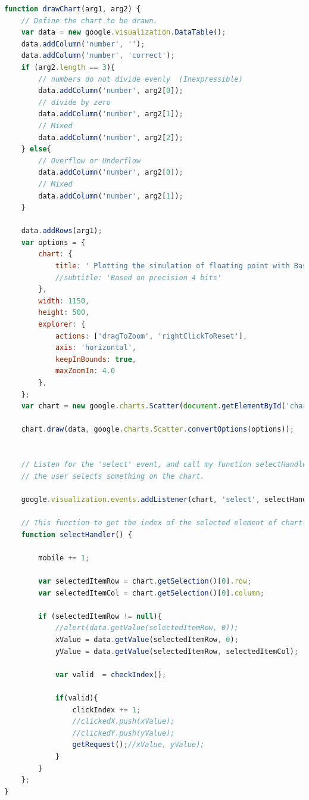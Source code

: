 \documentclass[11pt]{article}
\begin{document}
\begin{lstlisting}[label={lst:drawChart}, language=Javascript, caption={drawChart function will visualize the passed data to user.},]
function drawChart(arg1, arg2) {
	// Define the chart to be drawn. 
	var data = new google.visualization.DataTable();
	data.addColumn('number', '');
	data.addColumn('number', 'correct');
	if (arg2.length == 3){
		// numbers do not divide evenly  (Inexpressible) 
		data.addColumn('number', arg2[0]);
		// divide by zero
		data.addColumn('number', arg2[1]);
		// Mixed
		data.addColumn('number', arg2[2]);
	} else{
		// Overflow or Underflow
		data.addColumn('number', arg2[0]);
		// Mixed
		data.addColumn('number', arg2[1]);
	}
   
   	data.addRows(arg1);
    var options = {
    	chart: {
    		title: ' Plotting the simulation of floating point with Basic Arithmetics',
        	//subtitle: 'Based on precision 4 bits'
     	},
     	width: 1150,
     	height: 500,
     	explorer: {
     		actions: ['dragToZoom', 'rightClickToReset'],
        	axis: 'horizontal',
        	keepInBounds: true,
        	maxZoomIn: 4.0
    	},
    };
    var chart = new google.charts.Scatter(document.getElementById('chart_div1'));

    chart.draw(data, google.charts.Scatter.convertOptions(options));
 

	// Listen for the 'select' event, and call my function selectHandler() when
	// the user selects something on the chart.

    google.visualization.events.addListener(chart, 'select', selectHandler);

    // This function to get the index of the selected element of chart.
	function selectHandler() {

		mobile += 1;

		var selectedItemRow = chart.getSelection()[0].row;
		var selectedItemCol = chart.getSelection()[0].column;

		if (selectedItemRow != null){
			//alert(data.getValue(selectedItemRow, 0));
			xValue = data.getValue(selectedItemRow, 0);
			yValue = data.getValue(selectedItemRow, selectedItemCol);

			var valid  = checkIndex();

			if(valid){
				clickIndex += 1;
				//clickedX.push(xValue);
				//clickedY.push(yValue);
				getRequest();//xValue, yValue);
			}
		}
	};
}
\end{lstlisting}
\end{document}
